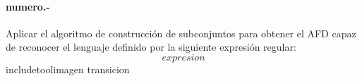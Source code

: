 

\paragraph{{numero}.-}\label{p{numero}}
Aplicar el algoritmo de construcción de subconjuntos para obtener el AFD capaz de reconocer el lenguaje definido por la siguiente expresión regular:
\[
    {expresion}
\]
{includetool}{{imagen}}
{transicion}
